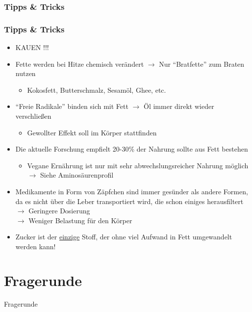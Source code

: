 \documentclass[xcolor=dvipsnames]{beamer}
\begin{document}
    \subsubsection{Tipps \& Tricks}
    \begin{frame}[allowframebreaks]
        \frametitle{Tipps \& Tricks}

        \begin{itemize}
            \item KAUEN !!!
        \end{itemize}

        \framebreak

        \begin{itemize}
            \setlength\itemsep{1em}
            \item Fette werden bei Hitze chemisch verändert $\rightarrow$ Nur "`Bratfette"' zum Braten nutzen
            \begin{itemize}
                \item Kokosfett, Butterschmalz, Sesamöl, Ghee, etc.
            \end{itemize}
            \item "`Freie Radikale"' binden sich mit Fett $\rightarrow$ Öl immer direkt wieder verschließen
            \begin{itemize}
                \item Gewollter Effekt soll im Körper stattfinden
            \end{itemize}
            \item Die aktuelle Forschung empfielt 20-30\% der Nahrung sollte aus Fett bestehen
            \begin{itemize}
                \item Vegane Ernährung ist nur mit sehr abwechslungsreicher Nahrung möglich $\rightarrow$ Siehe Aminosäurenprofil
            \end{itemize}
        \end{itemize}

        \framebreak

        \begin{itemize}
            \setlength\itemsep{1em}
            \item Medikamente in Form von Zäpfchen sind immer gesünder als andere Formen, da es nicht über die Leber transportiert wird, die schon einiges herausfiltert\\
            $\rightarrow$ Geringere Dosierung\\
            $\rightarrow$ Weniger Belastung für den Körper
            \item Zucker ist der \underline{einzige} Stoff, der ohne viel Aufwand in Fett umgewandelt werden kann!
        \end{itemize}
    \end{frame}

    \section{Fragerunde}
    {
        \begin{frame}
            \begin{center}
                \Huge Fragerunde
            \end{center}
        \end{frame}
    }
\end{document}
